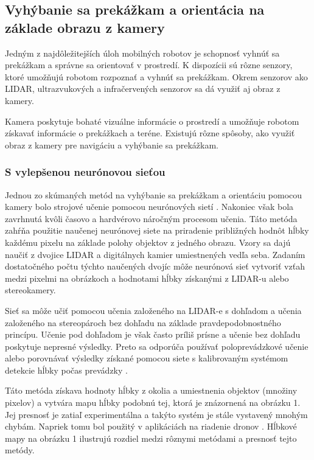 \subsection{Vyhýbanie sa prekážkam a orientácia na základe obrazu z kamery}
Jedným z najdôležitejších úloh mobilných robotov je schopnosť vyhnúť sa prekážkam a správne sa orientovať v prostredí. K dispozícii sú rôzne senzory, ktoré umožňujú robotom rozpoznať a vyhnúť sa prekážkam. Okrem senzorov ako LIDAR, ultrazvukových a infračervených senzorov sa dá využiť aj obraz z kamery.

Kamera poskytuje bohaté vizuálne informácie o prostredí a umožňuje robotom získavať informácie o prekážkach a teréne. Existujú rôzne spôsoby, ako využiť obraz z kamery pre navigáciu a vyhýbanie sa prekážkam.

\subsubsection{S vylepšenou neurónovou sieťou}
Jednou zo skúmaných metód na vyhýbanie sa prekážkam a orientáciu pomocou kamery bolo strojové učenie pomocou neurónových sietí \cite{citácia6}. Nakoniec však bola zavrhnutá kvôli časovo a hardvérovo náročným procesom učenia. Táto metóda zahŕňa použitie naučenej neurónovej siete na priradenie približných hodnôt hĺbky každému pixelu na základe polohy objektov z jedného obrazu. Vzory sa dajú naučiť z dvojice LIDAR a digitálnych kamier umiestnených vedľa seba. Zadaním dostatočného počtu týchto naučených dvojíc môže neurónová sieť vytvoriť vzťah medzi pixelmi na obrázkoch a hodnotami hĺbky získanými z LIDAR-u alebo stereokamery.

Sieť sa môže učiť pomocou učenia založeného na LIDAR-e s dohľadom a učenia založeného na stereopároch bez dohľadu na základe pravdepodobnostného princípu. Učenie pod dohľadom je však často príliš prísne a učenie bez dohľadu poskytuje nepresné výsledky. Preto sa odporúča používať poloprevádzkové učenie \cite{citácia7} alebo porovnávať výsledky získané pomocou siete s kalibrovaným systémom detekcie hĺbky počas prevádzky \cite{citácia8}.

Táto metóda získava hodnoty hĺbky z okolia a umiestnenia objektov (množiny pixelov) a vytvára mapu hĺbky podobnú tej, ktorá je znázornená na obrázku 1. Jej presnosť je zatiaľ experimentálna a takýto systém je stále vystavený mnohým chybám. Napriek tomu bol použitý v aplikáciách na riadenie dronov \cite{citácia9}. Hĺbkové mapy na obrázku 1 ilustrujú rozdiel medzi rôznymi metódami a presnosť tejto metódy.

